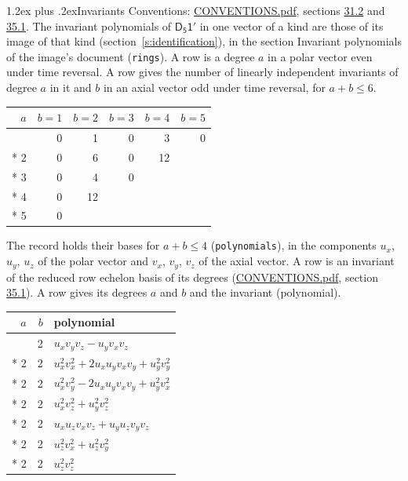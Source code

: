 \documentclass[10pt,a4paper]{article}
\makeatletter
\renewcommand\section{\@startsection{section}{1}{\z@}{-3ex plus -1ex minus -.2ex}%
  {1.2ex plus .2ex}{\normalfont\large\sffamily\bfseries\color{parttitle}}}
\numberwithin{equation}{section}
\newcommand{\grp}[1]{\mathsf{#1}}
\makeatother
\begin{document}
\section{Invariants}\label{s:invariants}
Conventions: \href{../../CONVENTIONS.pdf}{CONVENTIONS.pdf}, sections \href{../../CONVENTIONS.pdf\#conv.31.2}{31.2} and \href{../../CONVENTIONS.pdf\#conv.35.1}{35.1}.
The invariant polynomials of $\grp{D_{5}1'}$ in one vector of a kind are those of its image of that kind (section~\ref{s:identification}), in the section Invariant polynomials of the image's document (\texttt{rings}).
\leavevmode\label{n:index.degree.polar}\label{n:index.degree.axial}A row is a degree $a$ in a polar vector even under time reversal. A row gives the number of linearly independent invariants of degree $a$ in it and $b$ in an axial vector odd under time reversal, for $a + b \le 6$.
{\small\begin{longtable}{@{}rrrrrr@{}}\toprule
$a$ & $b = 1$ & $b = 2$ & $b = 3$ & $b = 4$ & $b = 5$\\\midrule\endhead
\bottomrule\endfoot\endlastfoot
1 & 0 & 1 & 0 & 3 & 0\\*
2 & 0 & 6 & 0 & 12 & \\*
3 & 0 & 4 & 0 &  & \\*
4 & 0 & 12 &  &  & \\*
5 & 0 &  &  &  & \\
\bottomrule\end{longtable}}
\leavevmode\label{n:local.component.polar}\label{n:local.component.axial}The record holds their bases for $a + b \le 4$ (\texttt{polynomials}), in the components $u_{x}$, $u_{y}$, $u_{z}$ of the polar vector and $v_{x}$, $v_{y}$, $v_{z}$ of the axial vector. \label{n:head.polynomial}A row is an invariant of the reduced row echelon basis of its degrees (\href{../../CONVENTIONS.pdf}{CONVENTIONS.pdf}, section \href{../../CONVENTIONS.pdf\#conv.35.1}{35.1}). A row gives its degrees $a$ and $b$ and the invariant (polynomial).
{\small\renewcommand{\arraystretch}{1.2}\begin{longtable}{@{}rrl@{}}\toprule
$a$ & $b$ & polynomial\\\midrule\endhead
\bottomrule\endfoot\endlastfoot
1 & 2 & $u_{x}v_{y}v_{z} - u_{y}v_{x}v_{z}$\\*
2 & 2 & $u_{x}^{2}v_{x}^{2} + 2u_{x}u_{y}v_{x}v_{y} + u_{y}^{2}v_{y}^{2}$\\*
2 & 2 & $u_{x}^{2}v_{y}^{2} - 2u_{x}u_{y}v_{x}v_{y} + u_{y}^{2}v_{x}^{2}$\\*
2 & 2 & $u_{x}^{2}v_{z}^{2} + u_{y}^{2}v_{z}^{2}$\\*
2 & 2 & $u_{x}u_{z}v_{x}v_{z} + u_{y}u_{z}v_{y}v_{z}$\\*
2 & 2 & $u_{z}^{2}v_{x}^{2} + u_{z}^{2}v_{y}^{2}$\\*
2 & 2 & $u_{z}^{2}v_{z}^{2}$\\
\bottomrule\end{longtable}}
\end{document}
